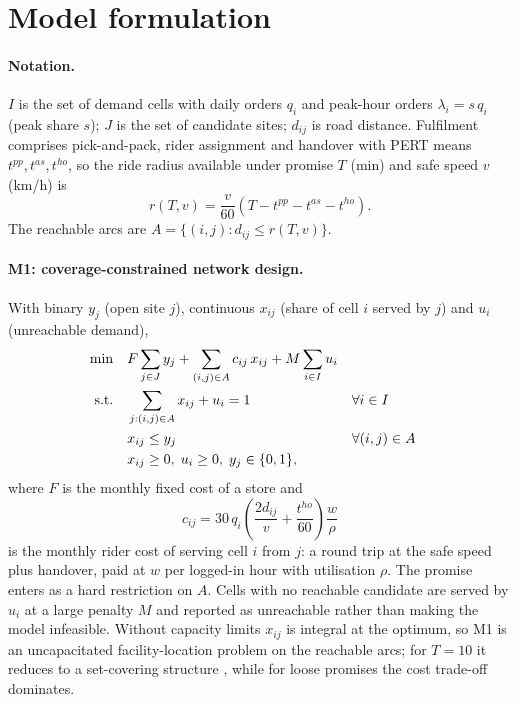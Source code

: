 \section{Model formulation}\label{sec:model}

\paragraph{Notation.} $I$ is the set of demand cells with daily orders $q_i$ and peak-hour orders $\lambda_i = s\,q_i$ (peak share $s$); $J$ is the set of candidate sites; $d_{ij}$ is road distance. Fulfilment comprises pick-and-pack, rider assignment and handover with PERT means $t^{pp}, t^{as}, t^{ho}$, so the ride radius available under promise $T$ (min) and safe speed $v$ (km/h) is
\begin{equation}
r(T,v) = \frac{v}{60}\left(T - t^{pp} - t^{as} - t^{ho}\right).
\end{equation}
The reachable arcs are $A = \{(i,j): d_{ij} \le r(T,v)\}$.

\paragraph{M1: coverage-constrained network design.} With binary $y_j$ (open site $j$), continuous $x_{ij}$ (share of cell $i$ served by $j$) and $u_i$ (unreachable demand),
\begin{align}
\min\quad & F \sum_{j\in J} y_j + \sum_{(i,j)\in A} c_{ij}\,x_{ij} + M\sum_{i\in I} u_i \label{eq:obj}\\
\text{s.t.}\quad & \sum_{j:(i,j)\in A} x_{ij} + u_i = 1 && \forall i\in I \label{eq:serve}\\
& x_{ij} \le y_j && \forall (i,j)\in A \label{eq:link}\\
& x_{ij}\ge 0,\; u_i \ge 0,\; y_j\in\{0,1\}, \notag
\end{align}
where $F$ is the monthly fixed cost of a store and
\begin{equation}
c_{ij} = 30\, q_i \left(\frac{2 d_{ij}}{v} + \frac{t^{ho}}{60}\right)\frac{w}{\rho}
\end{equation}
is the monthly rider cost of serving cell $i$ from $j$: a round trip at the safe speed plus handover, paid at $w$ per logged-in hour with utilisation $\rho$. The promise enters as a hard restriction on $A$. Cells with no reachable candidate are served by $u_i$ at a large penalty $M$ and reported as unreachable rather than making the model infeasible. Without capacity limits $x_{ij}$ is integral at the optimum, so M1 is an uncapacitated facility-location problem on the reachable arcs; for $T=10$ it reduces to a set-covering structure \citep{toregas1971}, while for loose promises the cost trade-off dominates.

